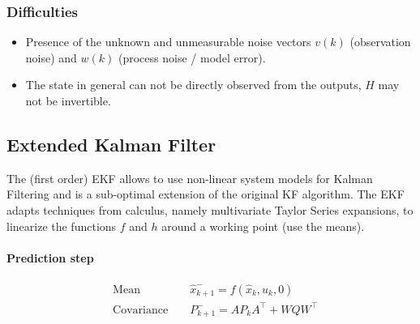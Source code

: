 \begin{multicols*}{2}
\subsubsection{Difficulties}
\begin{itemize}
	\item Presence of the unknown and unmeasurable noise vectors $v(k)$ (observation noise) and $w(k)$ (process noise / model error).
	\item The state in general can not be directly observed from the outputs, $H$ may not be invertible.
\end{itemize}

\subsection{Extended Kalman Filter}
The (first order) EKF allows to use non-linear system models for Kalman Filtering and is a sub-optimal extension of the original KF algorithm.
The EKF adapts techniques from calculus, namely multivariate Taylor Series expansions, to linearize the functions $f$ and $h$ around a working point (use the means). 

\paragraph{Prediction step}
\begin{align*}
	&\text{Mean} && \hat{x}_{k+1}^- = f(\hat{x}_k, u_k, 0)  \\
	&\text{Covariance } && P_{k+1}^- = A P_k A^\top + W Q W^\top 
\end{align*}


\end{multicols*}
